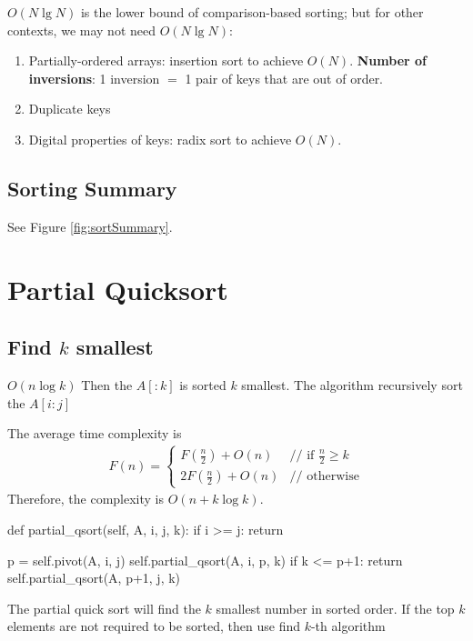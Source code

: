 $O(N\lg N)$ is the lower bound of comparison-based sorting; but for other
contexts, we may not need $O(N \lg N)$:
\begin{enumerate}
\item Partially-ordered arrays: insertion sort to achieve $O(N)$. \textbf{Number of inversions}: 1 inversion $=$ 1 pair of keys that are out
of order.
\item Duplicate keys
\item Digital properties of keys: radix sort to achieve $O(N)$.
\end{enumerate}

\subsection{Sorting Summary}
See Figure \ref{fig:sortSummary}.
\begin{figure*}[hbtp]
\centering
{}
\caption{Sort summary}
\label{fig:sortSummary} 
\end{figure*}
\section{Partial Quicksort}
\subsection{Find $k$ smallest}
 $O(n \log k)$
  Then the $A[:k]$ is sorted $k$ smallest. The algorithm recursively sort the $A[i:j]$

The average time complexity is
\begin{eqnarray*}
F(n) = \left\{ \begin{array}{rl}
  F(\frac{n}{2})+O(n) &\mbox{// if $\frac{n}{2} \geq k$} \\
  2F(\frac{n}{2})+O(n) &\mbox{// otherwise}
       \end{array} \right.
\end{eqnarray*}
Therefore, the complexity is $O(n+k \log k)$.
\begin{python}
def partial_qsort(self, A, i, j, k):
    if i >= j: return

    p = self.pivot(A, i, j)
    self.partial_qsort(A, i, p, k)
    if k <= p+1: return
    self.partial_qsort(A, p+1, j, k)
\end{python}
The partial quick sort will find the $k$ smallest number in sorted order. If the top $k$ elements are not required to be sorted, then use find $k$-th algorithm 

